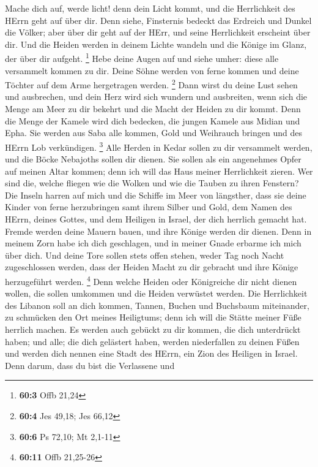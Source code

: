  Mache dich auf, werde licht! denn dein Licht kommt, und die
Herrlichkeit des HErrn geht auf über dir.  Denn siehe,
Finsternis bedeckt das Erdreich und Dunkel die Völker; aber über dir
geht auf der HErr, und seine Herrlichkeit erscheint über dir.
 Und die Heiden werden in deinem Lichte wandeln und die
Könige im Glanz, der über dir aufgeht. \footnote{\textbf{60:3} Offb
  21,24}  Hebe deine Augen auf und siehe umher: diese alle
versammelt kommen zu dir. Deine Söhne werden von ferne kommen und deine
Töchter auf dem Arme hergetragen werden. \footnote{\textbf{60:4} Jes
  49,18; Jes 66,12}  Dann wirst du deine Lust sehen und
ausbrechen, und dein Herz wird sich wundern und ausbreiten, wenn sich
die Menge am Meer zu dir bekehrt und die Macht der Heiden zu dir kommt.
 Denn die Menge der Kamele wird dich bedecken, die jungen
Kamele aus Midian und Epha. Sie werden aus Saba alle kommen, Gold und
Weihrauch bringen und des HErrn Lob verkündigen. \footnote{\textbf{60:6}
  Ps 72,10; Mt 2,1-11}  Alle Herden in Kedar sollen zu dir
versammelt werden, und die Böcke Nebajoths sollen dir dienen. Sie sollen
als ein angenehmes Opfer auf meinen Altar kommen; denn ich will das Haus
meiner Herrlichkeit zieren.  Wer sind die, welche fliegen
wie die Wolken und wie die Tauben zu ihren Fenstern?  Die
Inseln harren auf mich und die Schiffe im Meer von längsther, dass sie
deine Kinder von ferne herzubringen samt ihrem Silber und Gold, dem
Namen des HErrn, deines Gottes, und dem Heiligen in Israel, der dich
herrlich gemacht hat.  Fremde werden deine Mauern bauen,
und ihre Könige werden dir dienen. Denn in meinem Zorn habe ich dich
geschlagen, und in meiner Gnade erbarme ich mich über dich.
 Und deine Tore sollen stets offen stehen, weder Tag noch
Nacht zugeschlossen werden, dass der Heiden Macht zu dir gebracht und
ihre Könige herzugeführt werden. \footnote{\textbf{60:11} Offb 21,25-26}
 Denn welche Heiden oder Königreiche dir nicht dienen
wollen, die sollen umkommen und die Heiden verwüstet werden.
 Die Herrlichkeit des Libanon soll an dich kommen, Tannen,
Buchen und Buchsbaum miteinander, zu schmücken den Ort meines
Heiligtums; denn ich will die Stätte meiner Füße herrlich machen.
 Es werden auch gebückt zu dir kommen, die dich unterdrückt
haben; und alle; die dich gelästert haben, werden niederfallen zu deinen
Füßen und werden dich nennen eine Stadt des HErrn, ein Zion des Heiligen
in Israel.  Denn darum, dass du bist die Verlassene und
